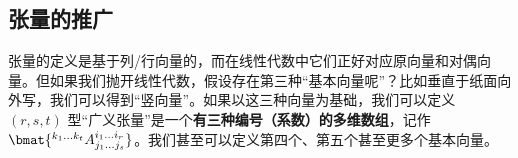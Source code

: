 

\subsection{张量的推广}

张量的定义是基于列/行向量的，而在线性代数中它们正好对应原向量和对偶向量。但如果我们抛开线性代数，假设存在第三种“基本向量呢”？比如垂直于纸面向外写，我们可以得到“竖向量”。如果以这三种向量为基础，我们可以定义 $(r, s, t)$ 型“广义张量”是一个\textbf{有三种编号（系数）的多维数组}，记作 $\bmat{{}^{k_1 \dots k_t}A_{j_1 \dots j_s}^{i_1 \dots i_r}}$。我们甚至可以定义第四个、第五个甚至更多个基本向量。
